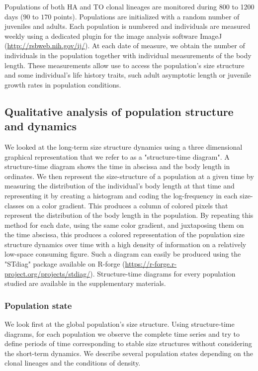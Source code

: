 Populations of both HA and TO clonal lineages are monitored during 800 to
1200 days ($90$ to $170$ points). Populations are initialized with a random
number of juveniles and adults. Each population is numbered and individuals are measured
weekly using a dedicated plugin for the image analysis software ImageJ
\autocites{abramoff2004a,mallard2012a,mallard2013a}
(\url{http://rsbweb.nih.gov/ij/}).
At each date of measure, we obtain the number of individuals in the population together with
individual measurements of the body length. These measurements allow use to
access the population's size structure and some individual's life history
traits, such adult asymptotic length or juvenile growth rates in population
conditions.

\subsection{Qualitative analysis of population structure and dynamics}

We looked at the long-term size structure dynamics using a three dimensional
graphical representation that we refer to as a "structure-time diagram". A
structure-time diagram shows the time in abscissa and the body length in
ordinates. We then represent the size-structure of a population at a given time
by measuring the distribution of the individual’s body length at that time and
representing it by creating a histogram and coding the log-frequency in each
size-classes on a color gradient. This produces a column of colored pixels that
represent the distribution of the body length in the population. By repeating
this method for each date, using the same color gradient, and juxtaposing them
on the time abscissa, this produces a colored representation of the population
size structure dynamics over time with a high density of information on a
relatively low-space consuming figure. Such a diagram can easily be produced
using the "STdiag" package available on R-forge
(\url{https://r-forge.r-project.org/projects/stdiag/}). Structure-time diagrams
for every population studied are available in the supplementary materials.

\subsubsection{Population state}

We look first at the global population’s size structure. Using structure-time
diagrams, for each population we observe the complete time series and try to
define periods of time corresponding to stable size structures without
considering the short-term dynamics. We describe several population states
depending on the clonal lineages and the conditions of density.

